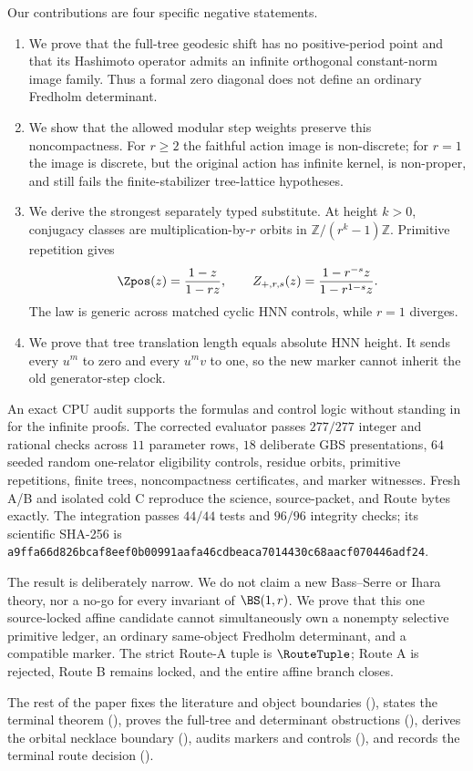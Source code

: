 Our contributions are four specific negative statements.
\begin{enumerate}
  \item We prove that the full-tree geodesic shift has no positive-period
  point and that its Hashimoto operator admits an infinite orthogonal
  constant-norm image family.  Thus a formal zero diagonal does not define an
  ordinary Fredholm determinant.
  \item We show that the allowed modular step weights preserve this
  noncompactness.  For $r\ge2$ the faithful action image is non-discrete; for
  $r=1$ the image is discrete, but the original action has infinite kernel,
  is non-proper, and still fails the finite-stabilizer tree-lattice
  hypotheses.
  \item We derive the strongest separately typed substitute.  At height
  $k>0$, conjugacy classes are multiplication-by-$r$ orbits in
  $\mathbb Z/(r^k-1)\mathbb Z$.  Primitive repetition gives
  \begin{equation}
    \Zpos(z)=\frac{1-z}{1-rz},
    \qquad
    Z_{+,r,s}(z)=\frac{1-r^{-s}z}{1-r^{1-s}z}.
    \label{eq:intro-rational}
  \end{equation}
  The law is generic across matched cyclic HNN controls, while $r=1$
  diverges.
  \item We prove that tree translation length equals absolute HNN height.
  It sends every $u^m$ to zero and every $u^mv$ to one, so the new marker
  cannot inherit the old generator-step clock.
\end{enumerate}

An exact CPU audit supports the formulas and control logic without standing
in for the infinite proofs.  The corrected evaluator passes $277/277$
integer and rational checks across $11$ parameter rows, $18$ deliberate GBS
presentations, $64$ seeded random one-relator eligibility controls, residue
orbits, primitive repetitions, finite trees, noncompactness certificates,
and marker witnesses.  Fresh A/B and isolated cold C reproduce the science,
source-packet, and Route bytes exactly.  The integration passes $44/44$ tests
and $96/96$ integrity checks; its scientific SHA-256 is
\texttt{a9ffa66d826bcaf8eef0b00991aafa46cdbeaca7014430c68aacf070446adf24}.

The result is deliberately narrow.  We do not claim a new Bass--Serre or
Ihara theory, nor a no-go for every invariant of $\BS(1,r)$.  We prove that
this one source-locked affine candidate cannot simultaneously own a nonempty
selective primitive ledger, an ordinary same-object Fredholm determinant,
and a compatible marker.  The strict Route-A tuple is
$\RouteTuple$; Route A is rejected, Route B remains locked, and the entire
affine branch closes.

The rest of the paper fixes the literature and object boundaries
(), states the terminal theorem
(), proves the full-tree and determinant obstructions
(), derives the orbital necklace boundary
(), audits markers and controls
(), and records the terminal route
decision ().
